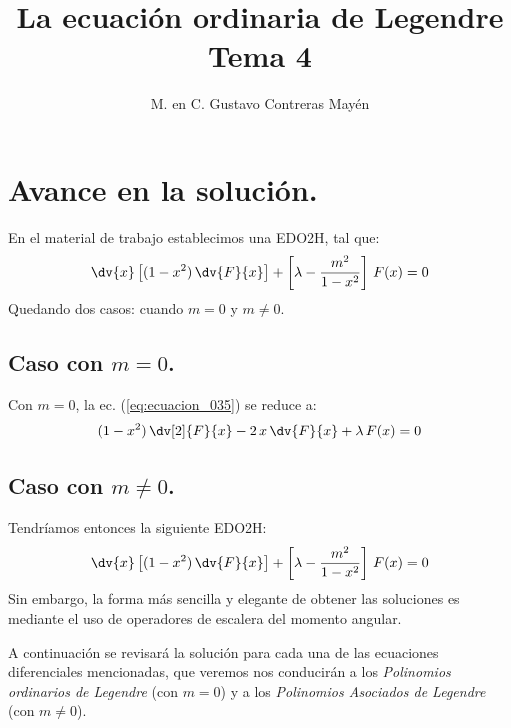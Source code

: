 

\title{La ecuación ordinaria de Legendre \\ {\large Tema 4}\vspace{-3ex}}
\author{M. en C. Gustavo Contreras Mayén}
\date{ }

\pagestyle{fancy}
\fancyhf{}
\lhead{\leftmark}
\rfoot{\thepage}
\setlength{\headheight}{16pt}%

\def\changemargin#1#2{\list{}{\rightmargin#2\leftmargin#1}\item[]}
\let\endchangemargin=\endlist 



\maketitle
\fontsize{14}{14}\selectfont
\tableofcontents
\newpage


\section{Avance en la solución.}

En el material de trabajo establecimos una EDO2H, tal que:
\begin{align}
\dv{x} \left[ (1 - x^{2}) \, \dv{F}{x} \right] + \left[ \lambda - \dfrac{m^{2}}{1 - x^{2}} \right] \, F(x) = 0
\label{eq:ecuacion_035}
\end{align}
Quedando dos casos: cuando $m = 0$ y $m \neq 0$.

\subsection*{Caso con \texorpdfstring{$m = 0$}{m=0}.}

Con $m = 0$, la ec. (\ref{eq:ecuacion_035}) se reduce a:
\begin{align}
(1 - x^{2}) \, \dv[2]{F}{x} - 2  \, x \, \dv{F}{x} + \lambda \, F(x) = 0
\label{eq:ecuacion_036}
\end{align}

\subsection*{Caso con \texorpdfstring{$m \neq 0$}{m  0}.}
Tendríamos entonces la siguiente EDO2H:
\begin{align}
\dv{x} \left[ (1 - x^{2}) \, \dv{F}{x} \right] + \left[ \lambda - \dfrac{m^{2}}{1 - x^{2}} \right] \, F(x) = 0
\label{eq:ecuacion_037}
\end{align}
Sin embargo, la forma más sencilla y elegante de obtener las soluciones es mediante el uso de operadores de escalera del momento angular.
\par
A continuación se revisará la solución para cada una de las ecuaciones diferenciales mencionadas, que veremos nos conducirán a los \emph{Polinomios ordinarios de Legendre} (con $m = 0$) y a los \emph{Polinomios Asociados de Legendre} (con $m \neq 0$).


